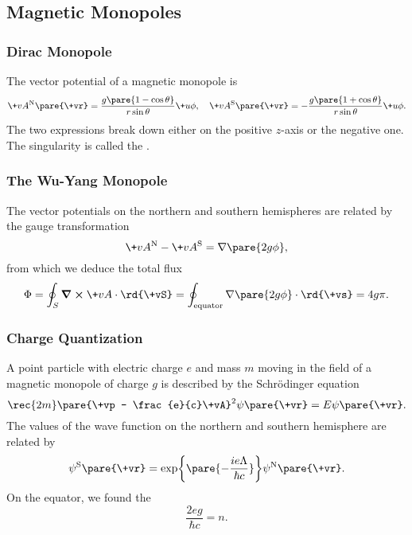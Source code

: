 \documentclass[hidelinks]{article}
\begin{document}


\subsection{Magnetic Monopoles} %
\label{sub:magnetic_monopoles}

\subsubsection{Dirac Monopole} %
\label{ssub:dirac_monopole}

The vector potential of a magnetic monopole is
\[ \+vA^{\mathrm{N}}\pare{\+vr} = \frac{g\pare{1-\cos\theta}}{r\sin\theta}\+u\phi,\quad \+vA^{\mathrm{S}}\pare{\+vr} = -\frac{g\pare{1+\cos\theta}}{r\sin\theta}\+u\phi. \]
The two expressions break down either on the positive $z$-axis or the negative one. The singularity is called the .


\subsubsection{The Wu-Yang Monopole} %
\label{ssub:the_wu_yang_monopole}

The vector potentials on the northern and southern hemispheres are related by the gauge transformation
\[ \+vA^{\mathrm{N}} - \+vA^{\mathrm{S}} = \nabla\pare{2g\phi}, \]
from which we deduce the total flux
\[ \Phi = \oint_S \curl \+vA\cdot \rd{\+vS} = \oint_{\mathrm{equator}} \nabla\pare{2g\phi}\cdot \rd{\+vs} = 4g\pi. \]


\subsubsection{Charge Quantization} %
\label{ssub:charge_quantization}

A point particle with electric charge $e$ and mass $m$ moving in the field of a magnetic monopole of charge $g$ is described by the Schr\"odinger equation
\[ \rec{2m}\pare{\+vp - \frac{e}{c}\+vA}^2 \psi\pare{\+vr} = E\psi\pare{\+vr}. \]
The values of the wave function on the northern and southern hemisphere are related by
\[ \psi^{\mathrm{S}}\pare{\+vr} = \exp\pare{-\frac{ie\Lambda}{\hbar c}}\psi^{\mathrm{N}}\pare{\+vr}. \]
On the equator, we found the 
\[ \frac{2eg}{\hbar c} = n. \]
\end{document}
